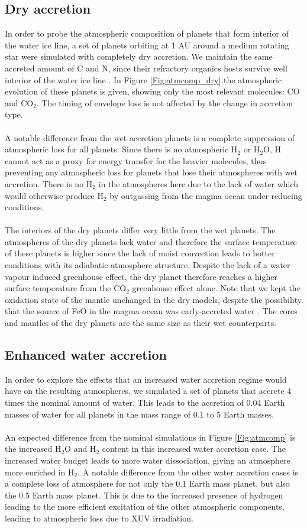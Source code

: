 \documentclass[bibyear,tradiabstract]{aa}
\begin{document}
\subsection{Dry accretion}
In order to probe the atmospheric composition of planets that form interior of the water ice line, a set of planets orbiting at 1 AU around a medium rotating star were simulated with completely dry accretion. We maintain the same accreted amount of C and N, since their refractory organics hosts survive well interior of the water ice line \citep{Johansen+2023III}. In Figure \ref{Fig:atmcomp_dry} the atmospheric evolution of these planets is given, showing only the most relevant molecules: CO and CO$_2$. The timing of envelope loss is not affected by the change in accretion type. \\
\\
A notable difference from the wet accretion planets is a complete suppression of atmospheric loss for all planets. Since there is no atmospheric H$_2$ or H$_2$O, H cannot act as a proxy for energy transfer for the heavier molecules, thus preventing any atmospheric loss for planets that lose their atmospheres with wet accretion. There is no H$_2$ in the atmospheres here due to the lack of water which would otherwise produce H$_2$ by outgassing from the magma ocean under reducing conditions.\\
\\
The interiors of the dry planets differ very little from the wet planets. The atmospheres of the dry planets lack water and therefore the surface temperature of these planets is higher since the lack of moist convection leads to hotter conditions with its adiabatic atmosphere structure. {Despite the lack of a water vapour induced greenhouse effect, the dry planet therefore reaches a higher surface temperature from the CO$_2$ greenhouse effect alone. Note that we kept the oxidation state of the mantle unchanged in the dry models, despite the possibility that the source of FeO in the magma ocean was early-accreted water \citep{Johansen+2023I}.} The cores and mantles of the dry planets are the same size as their wet counterparts.
{
\subsection{Enhanced water accretion}
In order to explore the effects that an increased water accretion regime would have on the resulting atmospheres, we simulated a set of planets that accrete 4 times the nominal amount of water. This leads to the accretion of 0.04 Earth masses of water for all planets in the mass range of 0.1 to 5 Earth masses.\\
\\
An expected difference from the nominal simulations in Figure \ref{Fig:atmcomp} is the increased H$_2$O and H$_2$ content in this increased water accretion case. The increased water budget leads to more water dissociation, giving an atmosphere more enriched in H$_2$. A notable difference from the other water accretion cases is a complete loss of atmosphere for not only the 0.1 Earth mass planet, but also the 0.5 Earth mass planet. This is due to the increased presence of hydrogen leading to the more efficient excitation of the other atmospheric components, leading to atmospheric loss due to XUV irradiation.
}
\end{document}
